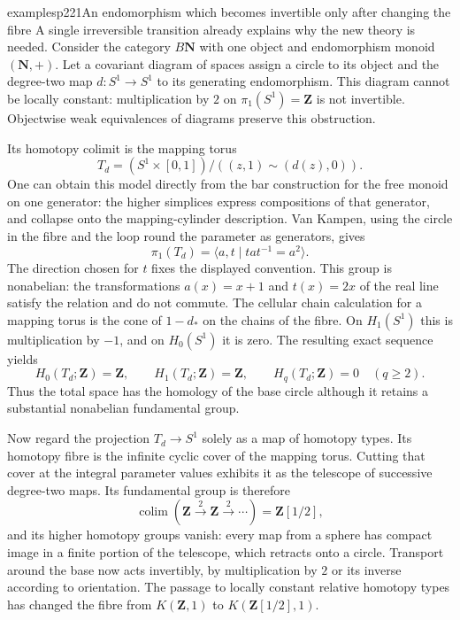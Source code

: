 
\begin{dcomment}{examples}{p221}{An endomorphism which becomes invertible only after changing the fibre}
A single irreversible transition already explains why the new theory is needed. Consider the category $B\mathbf N$ with one object and endomorphism monoid $(\mathbf N,+)$. Let a covariant diagram of spaces assign a circle to its object and the degree-two map $d:S^1\to S^1$ to its generating endomorphism. This diagram cannot be locally constant: multiplication by $2$ on $\pi_1(S^1)=\mathbf Z$ is not invertible. Objectwise weak equivalences of diagrams preserve this obstruction.

Its homotopy colimit is the mapping torus
\[
 T_d=(S^1\times[0,1])/((z,1)\sim(d(z),0)).
\]
One can obtain this model directly from the bar construction for the free monoid on one generator: the higher simplices express compositions of that generator, and collapse onto the mapping-cylinder description. Van Kampen, using the circle in the fibre and the loop round the parameter as generators, gives
\[
 \pi_1(T_d)=\langle a,t\mid tat^{-1}=a^2\rangle.
\]
The direction chosen for $t$ fixes the displayed convention. This group is nonabelian: the transformations $a(x)=x+1$ and $t(x)=2x$ of the real line satisfy the relation and do not commute. The cellular chain calculation for a mapping torus is the cone of $1-d_*$ on the chains of the fibre. On $H_1(S^1)$ this is multiplication by $-1$, and on $H_0(S^1)$ it is zero. The resulting exact sequence yields
\[
 H_0(T_d;\mathbf Z)=\mathbf Z,\qquad
 H_1(T_d;\mathbf Z)=\mathbf Z,\qquad H_q(T_d;\mathbf Z)=0\quad(q\geq2).
\]
Thus the total space has the homology of the base circle although it retains a substantial nonabelian fundamental group.

Now regard the projection $T_d\to S^1$ solely as a map of homotopy types. Its homotopy fibre is the infinite cyclic cover of the mapping torus. Cutting that cover at the integral parameter values exhibits it as the telescope of successive degree-two maps. Its fundamental group is therefore
\[
 \mathop{\mathrm{colim}}(\mathbf Z\xrightarrow{2}\mathbf Z\xrightarrow{2}\cdots)
       =\mathbf Z[1/2],
\]
and its higher homotopy groups vanish: every map from a sphere has compact image in a finite portion of the telescope, which retracts onto a circle. Transport around the base now acts invertibly, by multiplication by $2$ or its inverse according to orientation. The passage to locally constant relative homotopy types has changed the fibre from $K(\mathbf Z,1)$ to $K(\mathbf Z[1/2],1)$.


\end{dcomment}
